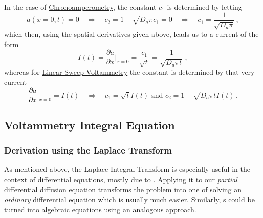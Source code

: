 \documentclass{prettytex/ox/mmsc-special-topic}
\begin{document}
  In the case of \underline{Chronoamperometry}, the constant $c_1$ is determined by letting
  $$a(x=0, t) = 0 \quad\Rightarrow\quad c_2 = 1 - \sqrt{D_a\pi} c_1 = 0 \quad\Rightarrow\quad c_1 = \frac{1}{\sqrt{D_a \pi}}\,,$$
  which then, using the spatial derivatives given above, leads us to a current of the form
  \begin{equation*}
    I(t) = \frac{\partial a}{\partial x}\bigg|_{x=0} = \frac{c_1}{\sqrt{t}} = \frac{1}{\sqrt{D_a \pi t}}\,,
  \end{equation*}
  whereas for \underline{Linear Sweep Voltammetry} the constant is determined by that very current
  $$\frac{\partial a}{\partial x}\bigg|_{x=0} = I(t) \quad\Rightarrow\quad c_1 = \sqrt{t} I(t) \text{ and } c_2 = 1 - \sqrt{D_a \pi t} I(t)\,.$$


  \subsection{Voltammetry Integral Equation}
  \subsubsection{Derivation using the Laplace Transform}
  As mentioned above, the Laplace Integral Transform is especially useful in the context of differential equations, mostly due to .
  Applying it to our \textit{partial} differential diffusion equation  transforms the problem into one of solving an \textit{ordinary} differential equation which is usually much easier.
  Similarly, s could be turned into algebraic equations using an analogous approach.
\end{document}
